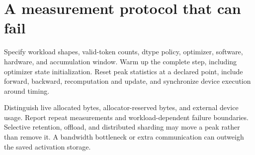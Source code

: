 \section{A measurement protocol that can fail}
Specify workload shapes, valid-token counts, dtype policy, optimizer, software,
hardware, and accumulation window. Warm up the complete step, including optimizer
state initialization. Reset peak statistics at a declared point, include forward,
backward, recomputation and update, and synchronize device execution around timing.

Distinguish live allocated bytes, allocator-reserved bytes, and external device
usage. Report repeat measurements and workload-dependent failure boundaries.
Selective retention, offload, and distributed sharding may move a peak rather than
remove it. A bandwidth bottleneck or extra communication can outweigh the saved
activation storage.

